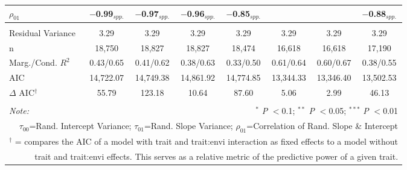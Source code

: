 \documentclass[12pt, letterpaper]{article}
\begin{document}
\begin{table}[h]
{\begin{tabular}{lccccccc}
 $\rho_{01}$ & $-$0.99$_{spp.}$ & $-$0.97$_{spp.}$ & $-$0.96$_{spp.}$ & $-$0.85$_{spp.}$ & & & $-$0.88$_{spp.}$ \\
\hline \\[-1.8ex] 
\rowcolor[gray]{.95} Residual Variance & 3.29 & 3.29 & 3.29 & 3.29 & 3.29 & 3.29 & 3.29\\
n & 18,750 & 18,827 & 18,827 & 18,474 & 16,618 & 16,618 & 17,190\\ 
\rowcolor[gray]{.95} Marg./Cond. $R^2$ & 0.43/0.65	& 0.41/0.62 &	0.38/0.63 & 0.33/0.50 & 0.61/0.64 &	0.60/0.67 & 0.38/0.55 \\
AIC  & 14,722.07 & 14,749.38 & 14,861.92 & 14,774.85 & 13,344.33 & 13,346.40 & 13,502.53 \\ 
\hline 
\rowcolor[gray]{.95}$\Delta$ AIC$^\dagger$ & 55.79 & 123.18 & 10.64 & 87.60 & 5.06 & 2.99 & 46.13 \\
\hline 
\hline \\[-1.8ex] 
\textit{Note:} & \multicolumn{7}{r}{$^{*}$ \textit{P} $<$0.1; $^{**}$ \textit{P} $<$0.05; $^{***}$ \textit{P} $<$0.01}\\
\multicolumn{8}{r}{$\tau_{00}$=Rand. Intercept Variance; $\tau_{01}$=Rand. Slope Variance; $\rho_{01}$=Correlation of Rand. Slope \& Intercept}\\ 
\multicolumn{8}{r}{$^\dagger$ = compares the AIC of a model with trait and trait:envi interaction as fixed effects to a model without}\\
\multicolumn{8}{r}{trait and trait:envi effects. This serves as a relative metric of the predictive power of a given trait.}
\end{tabular}} 
\end{table} 
\end{document}
